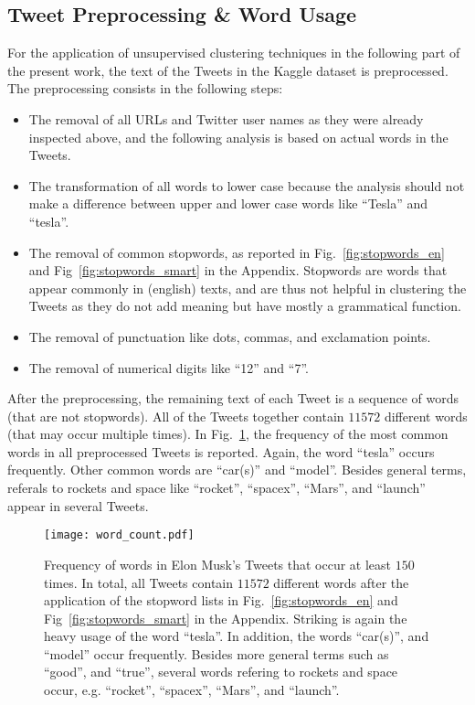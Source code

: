 \subsection{Tweet Preprocessing \& Word Usage}

For the application of unsupervised clustering techniques in the following part of the present work, the text of the Tweets in the Kaggle dataset is preprocessed. The preprocessing consists in the following steps:

\begin{itemize}
\item The removal of all URLs and Twitter user names as they were already inspected above, and the following analysis is based on actual words in the Tweets.
\item The transformation of all words to lower case because the analysis should not make a difference between upper and lower case words like \enquote{Tesla} and \enquote{tesla}.
\item The removal of common stopwords, as reported in Fig.~\ref{fig:stopwords_en} and Fig~\ref{fig:stopwords_smart} in the Appendix. Stopwords are words that appear commonly in (english) texts, and are thus not helpful in clustering the Tweets as they do not add meaning but have mostly a grammatical function.
\item The removal of punctuation like dots, commas, and exclamation points.	
\item The removal of numerical digits like \enquote{12} and \enquote{7}.
\end{itemize}

After the preprocessing, the remaining text of each Tweet is a sequence of words (that are not stopwords). All of the Tweets together contain $11572$ different words (that may occur multiple times). In Fig.~\ref{fig:word_count}, the frequency of the most common words in all preprocessed Tweets is reported. Again, the word \enquote{tesla} occurs frequently. Other common words are \enquote{car(s)} and \enquote{model}. Besides general terms, referals to rockets and space like \enquote{rocket}, \enquote{spacex}, \enquote{Mars}, and \enquote{launch} appear in several Tweets.

\begin{figure}[h!]
\centering
\texttt{[image: word\_count.pdf]}
\caption{Frequency of words in Elon Musk's Tweets that occur at least $150$ times. In total, all Tweets contain $11572$ different words after the application of the stopword lists in Fig.~\ref{fig:stopwords_en} and Fig~\ref{fig:stopwords_smart} in the Appendix. Striking is again the heavy usage of the word \enquote{tesla}. In addition, the words \enquote{car(s)}, and \enquote{model} occur frequently. Besides more general terms such as \enquote{good}, and \enquote{true}, several words refering to rockets and space occur, e.g. \enquote{rocket}, \enquote{spacex}, \enquote{Mars}, and \enquote{launch}.}
\label{fig:word_count}
\end{figure}